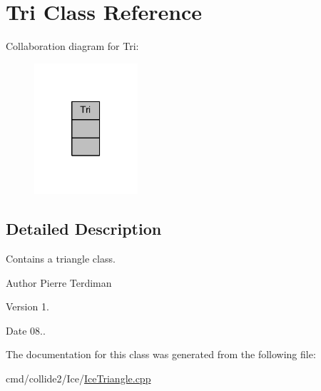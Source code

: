 \hypertarget{classTri}{}\section{Tri Class Reference}
\label{classTri}


Collaboration diagram for Tri\+:
\nopagebreak
\begin{figure}[H]
\begin{center}
\leavevmode
\includegraphics[width=109pt]{d3/d19/classTri__coll__graph}
\end{center}
\end{figure}


\subsection{Detailed Description}
Contains a triangle class.

\begin{DoxyAuthor}{Author}
Pierre Terdiman 
\end{DoxyAuthor}
\begin{DoxyVersion}{Version}
1. 
\end{DoxyVersion}
\begin{DoxyDate}{Date}
08.. 
\end{DoxyDate}


The documentation for this class was generated from the following file\+:\begin{DoxyCompactItemize}
\item 
cmd/collide2/\+Ice/\hyperlink{IceTriangle_8cpp}{Ice\+Triangle.\+cpp}\end{DoxyCompactItemize}
